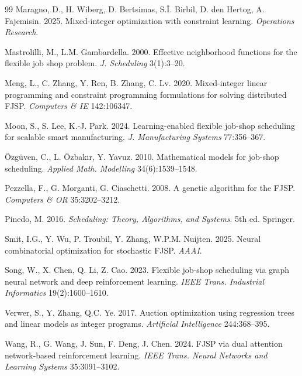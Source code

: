 \documentclass[12pt]{article}
\begin{document}
\begin{thebibliography}{99}
 Maragno, D., H. Wiberg, D. Bertsimas, S.\.{I}. Birbil, D. den Hertog, A. Fajemisin. 2025. Mixed-integer optimization with constraint learning. \textit{Operations Research}.

 Mastrolilli, M., L.M. Gambardella. 2000. Effective neighborhood functions for the flexible job shop problem. \textit{J. Scheduling} 3(1):3--20.

 Meng, L., C. Zhang, Y. Ren, B. Zhang, C. Lv. 2020. Mixed-integer linear programming and constraint programming formulations for solving distributed FJSP. \textit{Computers \& IE} 142:106347.

 Moon, S., S. Lee, K.-J. Park. 2024. Learning-enabled flexible job-shop scheduling for scalable smart manufacturing. \textit{J. Manufacturing Systems} 77:356--367.

 \"Ozg\"uven, C., L. \"Ozbak{\i}r, Y. Yavuz. 2010. Mathematical models for job-shop scheduling. \textit{Applied Math. Modelling} 34(6):1539--1548.

 Pezzella, F., G. Morganti, G. Ciaschetti. 2008. A genetic algorithm for the FJSP. \textit{Computers \& OR} 35:3202--3212.

 Pinedo, M. 2016. \textit{Scheduling: Theory, Algorithms, and Systems}. 5th ed. Springer.

 Smit, I.G., Y. Wu, P. Troubil, Y. Zhang, W.P.M. Nuijten. 2025. Neural combinatorial optimization for stochastic FJSP. \textit{AAAI}.

 Song, W., X. Chen, Q. Li, Z. Cao. 2023. Flexible job-shop scheduling via graph neural network and deep reinforcement learning. \textit{IEEE Trans. Industrial Informatics} 19(2):1600--1610.

 Verwer, S., Y. Zhang, Q.C. Ye. 2017. Auction optimization using regression trees and linear models as integer programs. \textit{Artificial Intelligence} 244:368--395.

 Wang, R., G. Wang, J. Sun, F. Deng, J. Chen. 2024. FJSP via dual attention network-based reinforcement learning. \textit{IEEE Trans. Neural Networks and Learning Systems} 35:3091--3102.


\end{thebibliography}
\end{document}
